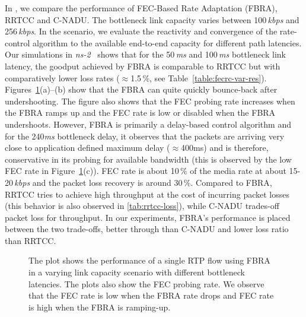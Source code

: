 In , we compare the performance of FEC-Based Rate Adaptation
(FBRA), RRTCC and C-NADU. The bottleneck link capacity varies between
100\,\emph{kbps} and 256\,\emph{kbps}. In the scenario, we evaluate the
reactivity and convergence of the rate-control algorithm to the available 
end-to-end capacity for different path latencies. Our simulations in
\emph{ns-2}~\cite{ns2} shows that for the 50\,\emph{ms} and 100\,\emph{ms}
bottleneck link latency, the goodput achieved by FBRA is comparable to RRTCC
but with comparatively lower loss rates ($\approx$1.5\,\%, see
Table~\ref{table:fecrc-var-res}). Figures~\ref{fig:fecrc-var}(a)--(b) show
that the FBRA can quite quickly bounce-back after undershooting. The figure
also shows that the FEC probing rate increases when the FBRA ramps up and the
FEC rate is low or disabled when the FBRA undershoots. However, FBRA is
primarily a delay-based control algorithm and for the 240\emph{ms} bottleneck
delay, it observes that the packets are arriving very close to application
defined maximum delay ($\approx$400ms) and is therefore, conservative in its
probing for available bandwidth (this is observed by the low FEC rate in
Figure~\ref{fig:fecrc-var}(c)). FEC rate is about 10\,\% of the media rate at
about 15-20\,\emph{kbps} and the packet loss recovery is around 30\,\%.
Compared to FBRA, RRTCC tries to achieve high throughput at the cost of
incurring packet losses (this behavior is also observed in \ref{tab:rrtcc-loss}), 
while C-NADU trades-off packet loss for throughput. In our
experiments, FBRA's performance is placed between the two trade-offs, better
through than C-NADU and lower loss ratio than RRTCC.



\begin{figure}
  \centerline{
}
\caption{The plot shows the performance of a single RTP flow using FBRA in a
varying link capacity scenario with different bottleneck latencies. The plots
also show the FEC probing rate. We observe that the FEC rate is low when the
FBRA rate drops and FEC rate is high when the FBRA is ramping-up.}
\label{fig:fecrc-var}
\end{figure}

